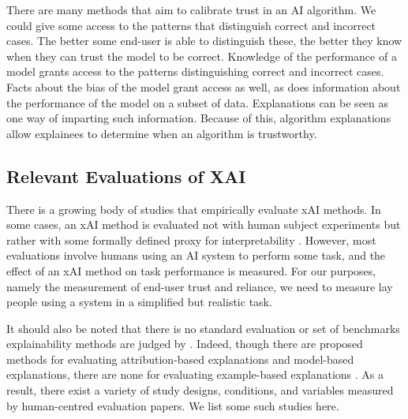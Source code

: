 There are many methods that aim to calibrate trust in an AI algorithm. We could give some access to the patterns that distinguish correct and incorrect cases. The better some end-user is able to distinguish these, the better they know when they can trust the model to be correct. Knowledge of the performance of a model grants access to the patterns distinguishing correct and incorrect cases. Facts about the bias of the model grant access as well, as does information about the performance of the model on a subset of data. Explanations can be seen as one way of imparting such information. Because of this, algorithm explanations allow explainees to determine when an algorithm is trustworthy. 

\subsection{Relevant Evaluations of XAI}
There is a growing body of studies that empirically evaluate xAI methods. In some cases, an xAI method is evaluated not with human subject experiments but rather with some formally defined proxy for interpretability \cite{doshi-velez_towards_2017}. However, most evaluations involve humans using an AI system to perform some task, and the effect of an xAI method on task performance is measured.  For our purposes, namely the measurement of end-user trust and reliance, we need to measure lay people using a system in a simplified but realistic task.

It should also be noted that there is no standard evaluation or set of benchmarks explainability methods are judged by \cite{doshi-velez_towards_2017}. Indeed, though there are proposed methods for evaluating attribution-based explanations and model-based explanations, there are none for evaluating example-based explanations \cite{markus_role_2021}. As a result, there exist a variety of study designs, conditions, and variables measured by human-centred evaluation papers. We list some such studies here.

